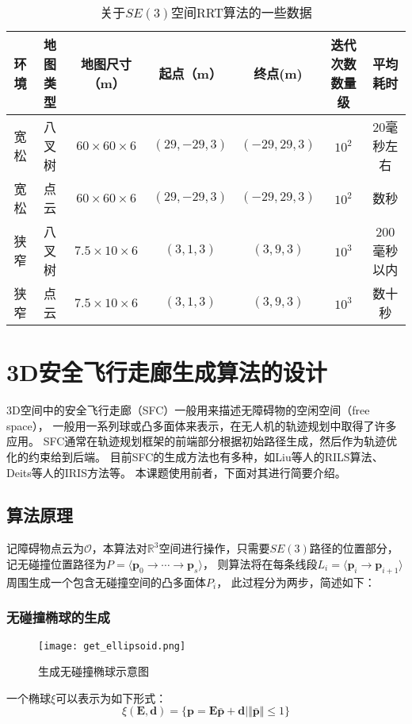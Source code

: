 \begin{table}[htbp]
  \caption{关于$SE(3)$空间RRT算法的一些数据\label{tab:rrtse3_performance_data}}
  \vspace{0.5em}\centering\wuhao
  \begin{tabular}{ccccccc}
  \toprule[1.5pt]
  环境 & 地图类型 & 地图尺寸（m） & 起点（m） & 终点(m) & 迭代次数数量级 & 平均耗时\\
  \midrule[1pt]
  宽松 & 八叉树 & $60\times60\times6$ & $(29, -29, 3)$ & $(-29, 29, 3)$ & $10^2$ & 20毫秒左右\\
  宽松 & 点云 & $60\times60\times6$ & $(29, -29, 3)$ & $(-29, 29, 3)$ & $10^2$ & 数秒\\
  狭窄 & 八叉树 & $7.5\times10\times6$  & $(3, 1, 3)$ & $(3, 9, 3)$ & $10^3$ & 200毫秒以内\\
  狭窄 & 点云 & $7.5\times10\times6$  & $(3, 1, 3)$ & $(3, 9, 3)$ & $10^3$ & 数十秒\\
  \bottomrule[1.5pt]
  \end{tabular}
\end{table}

\section{3D安全飞行走廊生成算法的设计}\label{sec:sfc_gen_algorithm}
3D空间中的安全飞行走廊（SFC）一般用来描述无障碍物的空闲空间（free space），
一般用一系列球或凸多面体来表示，在无人机的轨迹规划中取得了许多应用\cite{2021Fast,mohta2018fast,gao2019flying}。
SFC通常在轨迹规划框架的前端部分根据初始路径生成，然后作为轨迹优化的约束给到后端。
目前SFC的生成方法也有多种，如Liu等人的RILS算法\cite{2017Planning}、Deits等人的IRIS方法\cite{deits2015computing}等。
本课题使用前者，下面对其进行简要介绍。
\subsection{算法原理}\label{subsec:design_of_sfc_gen_algorithm}
记障碍物点云为$\mathcal{O}$，本算法对$\mathbb{R}^3$空间进行操作，只需要$SE(3)$路径的位置部分，
记无碰撞位置路径为$P = \langle \bm{p}_0 \rightarrow \cdots \rightarrow \bm{p}_s \rangle$，
则算法将在每条线段$L_i = \langle \bm{p}_i \rightarrow \bm{p}_{i+1} \rangle$周围生成一个包含无碰撞空间的凸多面体$P_i$，
此过程分为两步，简述如下：
\subsubsection{无碰撞椭球的生成}
\begin{figure}[ht]
  \centering
  \texttt{[image: get\_ellipsoid.png]}
  \caption{生成无碰撞椭球示意图}
  \label{fig:get_ellipsoid}
\end{figure}
一个椭球$\xi$可以表示为如下形式：
\begin{equation}
  \xi(\bm{E}, \bm{d}) = \{\bm{p} = \bm{E}\bar{\bm{p}} + \bm{d} \mid \Vert \bar{\bm{p}} \Vert \leq 1 \}
  \label{equ:representation_of_ellipsoids}
\end{equation}


